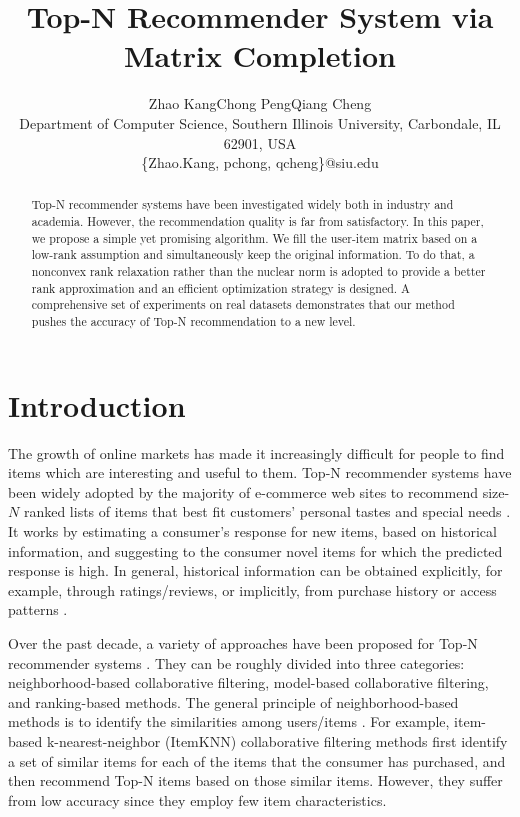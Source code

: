 \documentclass[letterpaper]{article}
\begin{document}
\title{Top-N Recommender System via Matrix Completion}
\author{Zhao Kang\quad Chong Peng\quad Qiang Cheng\\
Department of Computer Science, Southern Illinois University, Carbondale, IL 62901, USA\\
\{Zhao.Kang, pchong, qcheng\}@siu.edu\\
}
\maketitle
\begin{abstract}
Top-N recommender systems have been investigated widely both in industry and academia. However, the recommendation quality is far from satisfactory. In this paper, we propose a simple yet promising algorithm. We fill the user-item matrix based on a low-rank assumption and simultaneously keep the original information. To do that, a nonconvex rank relaxation rather than the nuclear norm is adopted to provide a better rank approximation and an efficient optimization strategy is designed. A comprehensive set of experiments on real datasets demonstrates that our method pushes the accuracy of Top-N recommendation to a new level.

\end{abstract}

\section{Introduction}
The growth of online markets has made it increasingly difficult for people to find items which are interesting and useful to them. Top-N recommender systems have been widely adopted by the majority of e-commerce web sites to recommend size-$N$ ranked lists of items that best fit customers' personal tastes and special needs \cite{linden2003amazon}. It works by estimating a consumer's  response for new items, based on historical information, and suggesting to the consumer novel items for which the predicted response is high. In general, historical information can be obtained explicitly, for example, through ratings/reviews, or implicitly, from purchase history or access patterns \cite{desrosiers2011comprehensive}.

Over the past decade, a variety of approaches have been proposed for Top-N recommender systems \cite{ricci2011introduction}. They can be roughly divided into three categories: %
neighborhood-based collaborative filtering, model-based collaborative filtering, and ranking-based methods. The general principle of neighborhood-based methods is to identify the similarities among users/items \cite{deshpande2004item}. For example, item-based k-nearest-neighbor (ItemKNN) collaborative filtering methods first identify a set of similar items for each of the items that the consumer has purchased, and then recommend Top-N items based on those similar items. However, they suffer from low accuracy since they employ few item characteristics.
\end{document}
